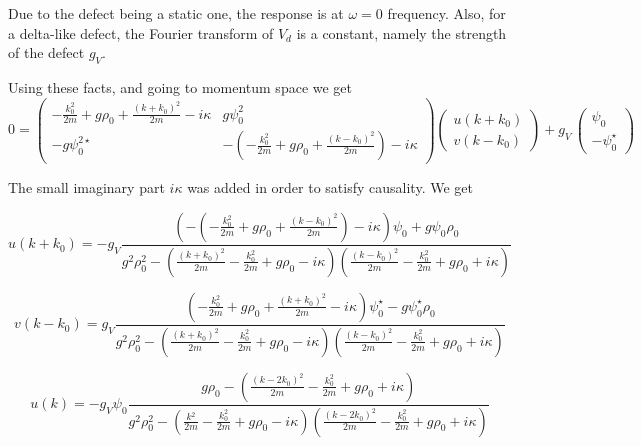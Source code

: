 \documentclass[a4paper,prb,10pt,aps]{revtex4-1}
\begin{document}
Due to the defect being a static one, the response is at $\omega=0$ frequency. Also, for a delta-like defect, the Fourier transform of $V_d$ is a constant, namely the strength of the defect $g_V$.

Using these facts, and going to momentum space we get
\begin{equation}
0=\left(\begin{array}{cc}
-\frac{k_{0}^{2}}{2m}+g\rho_{0}+\frac{(k+k_{0})^{2}}{2m}-i\kappa & g\psi_{0}^{2}\\
-g\psi_{0}^{2\star} & -\left(-\frac{k_{0}^{2}}{2m}+g\rho_{0}+\frac{(k-k_{0})^{2}}{2m}\right)-i\kappa
\end{array}\right)
\left(\begin{array}{c}
u(k+k_0)\\
v(k-k_0)
\end{array}\right)
+g_V\,\left(\begin{array}{c}
\psi_{0}\\
-\psi_{0}^{\star}
\end{array}\right)
\end{equation}

The small imaginary part $i\kappa$ was added in order to satisfy causality.
We get

\begin{equation}
  \label{eq:34}
u(k+k_0)=-g_{V}\frac{\left(-\left(-\frac{k_{0}^{2}}{2m}+g\rho_{0}+\frac{(k-k_{0})^{2}}{2m}\right)-i\kappa\right)\psi_{0}+g\psi_{0}\rho_{0}}{g^{2}\rho_{0}^{2}-\left(\frac{(k+k_{0})^{2}}{2m}-\frac{k_{0}^{2}}{2m}+g\rho_{0}-i\kappa\right)\left(\frac{(k-k_{0})^{2}}{2m}-\frac{k_{0}^{2}}{2m}+g\rho_{0}+i\kappa\right)}  
\end{equation}

\begin{equation}
  \label{eq:35}
v(k-k_0)=g_{V}\frac{\left(-\frac{k_{0}^{2}}{2m}+g\rho_{0}+\frac{(k+k_{0})^{2}}{2m}-i\kappa\right)\psi_{0}^{\star}-g\psi_{0}^{\star}\rho_{0}}{g^{2}\rho_{0}^{2}-\left(\frac{(k+k_{0})^{2}}{2m}-\frac{k_{0}^{2}}{2m}+g\rho_{0}-i\kappa\right)\left(\frac{(k-k_{0})^{2}}{2m}-\frac{k_{0}^{2}}{2m}+g\rho_{0}+i\kappa\right)}  
\end{equation}


\begin{equation}
u(k)=-g_{V}\psi_{0}\frac{g\rho_{0}-\left(\frac{(k-2k_{0})^{2}}{2m}-\frac{k_{0}^{2}}{2m}+g\rho_{0}+i\kappa\right)}{g^{2}\rho_{0}^{2}-\left(\frac{k{}^{2}}{2m}-\frac{k_{0}^{2}}{2m}+g\rho_{0}-i\kappa\right)\left(\frac{(k-2k_{0})^{2}}{2m}-\frac{k_{0}^{2}}{2m}+g\rho_{0}+i\kappa\right)}
\end{equation}
\end{document}
